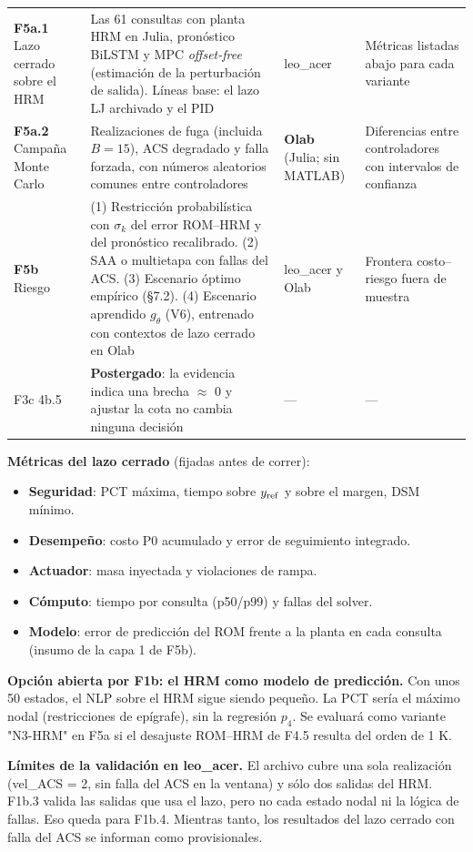 \documentclass[11pt,a4paper]{article}
\begin{document}
{\begin{xltabular}{\linewidth}{@{}YYYY@{}}
\textbf{F5a.1} Lazo cerrado sobre el HRM & Las 61 consultas con planta HRM en Julia, pronóstico BiLSTM y MPC \emph{offset-free} (estimación de la perturbación de salida). Líneas base: el lazo LJ archivado y el PID & leo\_acer & Métricas listadas abajo para cada variante \\
\textbf{F5a.2} Campaña Monte Carlo & Realizaciones de fuga (incluida $B=15$), ACS degradado y falla forzada, con números aleatorios comunes entre controladores & \textbf{Olab} (Julia; sin MATLAB) & Diferencias entre controladores con intervalos de confianza \\
\textbf{F5b} Riesgo & (1) Restricción probabilística con $\sigma_k$ del error ROM–HRM y del pronóstico recalibrado. (2) SAA o multietapa con fallas del ACS. (3) Escenario óptimo empírico (\S{}7.2). (4) Escenario aprendido $g_\theta$ (V6), entrenado con contextos de lazo cerrado en Olab & leo\_acer y Olab & Frontera costo–riesgo fuera de muestra \\
F3c 4b.5 & \textbf{Postergado}: la evidencia indica una brecha $\approx$ 0 y ajustar la cota no cambia ninguna decisión & — & — \\
\bottomrule
\end{xltabular}}

\textbf{Métricas del lazo cerrado} (fijadas antes de correr):

\begin{itemize}
\item \textbf{Seguridad}: PCT máxima, tiempo sobre $y_{\rm ref}$ y sobre el margen, DSM mínimo.
\item \textbf{Desempeño}: costo P0 acumulado y error de seguimiento integrado.
\item \textbf{Actuador}: masa inyectada y violaciones de rampa.
\item \textbf{Cómputo}: tiempo por consulta (p50/p99) y fallas del solver.
\item \textbf{Modelo}: error de predicción del ROM frente a la planta en cada consulta (insumo de la capa 1 de F5b).
\end{itemize}

\textbf{Opción abierta por F1b: el HRM como modelo de predicción.} Con unos 50 estados, el NLP sobre el HRM sigue siendo pequeño. La PCT sería el máximo nodal (restricciones de epígrafe), sin la regresión $p_4$. Se evaluará como variante "N3-HRM" en F5a si el desajuste ROM–HRM de F4.5 resulta del orden de 1 K.

\textbf{Límites de la validación en leo\_acer.} El archivo cubre una sola realización (vel\_ACS = 2, sin falla del ACS en la ventana) y sólo dos salidas del HRM. F1b.3 valida las salidas que usa el lazo, pero no cada estado nodal ni la lógica de fallas. Eso queda para F1b.4. Mientras tanto, los resultados del lazo cerrado con falla del ACS se informan como provisionales.
\end{document}
